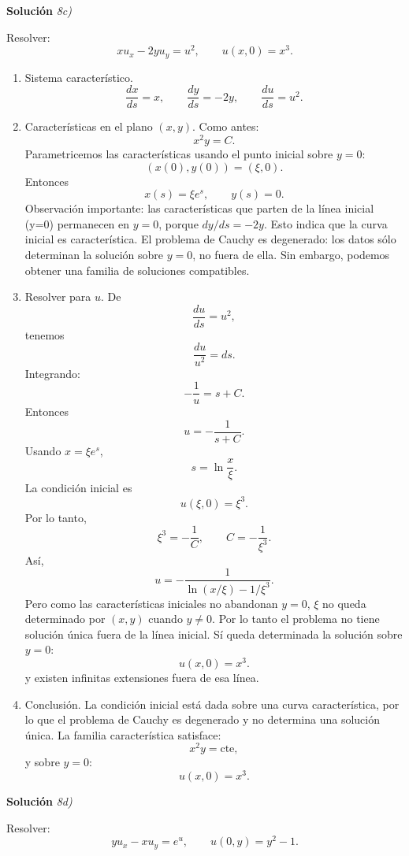 \documentclass[11pt,spanish]{article}
\newcounter{problema}
\begin{document}
\vspace{0.5cm}
{\bf Soluci\'on }{\em 8c)}
\vspace{0.5cm}

Resolver:
$$
x u_x-2y u_y=u^2,
\qquad
u(x,0)=x^3.
$$

\begin{enumerate}
\item Sistema característico.
$$
\frac{dx}{ds}=x,
\qquad
\frac{dy}{ds}=-2y,
\qquad
\frac{du}{ds}=u^2.
$$

\item Características en el plano $(x,y)$.
Como antes:
$$
x^2y=C.
$$
Parametricemos las características usando el punto inicial sobre $y=0$:
$$
(x(0),y(0))=(\xi,0).
$$
Entonces
$$
x(s)=\xi e^s,
\qquad
y(s)=0.
$$
Observación importante: las características que parten de la línea inicial (y=0) permanecen en $y=0$, porque $dy/ds=-2y$.
Esto indica que la curva inicial es característica. El problema de Cauchy es degenerado: los datos sólo determinan la solución sobre $y=0$, no fuera de ella.
Sin embargo, podemos obtener una familia de soluciones compatibles.

\item Resolver para $u$.
De
$$
\frac{du}{ds}=u^2,
$$
tenemos
$$
\frac{du}{u^2}=ds.
$$
Integrando:
$$
-\frac1u=s+C.
$$
Entonces
$$
u=-\frac1{s+C}.
$$
Usando $x=\xi e^s$,
$$
s=\ln\frac{x}{\xi}.
$$
La condición inicial es
$$
u(\xi,0)=\xi^3.
$$
Por lo tanto,
$$
\xi^3
=
-\frac1C,
\qquad
C=-\frac1{\xi^3}.
$$
Así,
$$
u=
-\frac1{\ln(x/\xi)-1/\xi^3}.
$$
Pero como las características iniciales no abandonan $y=0$, $\xi$ no queda determinado por $(x,y)$ cuando $y\neq0$. Por lo tanto el problema no tiene solución única fuera de la línea inicial.
Sí queda determinada la solución sobre $y=0$:
$$
u(x,0)=x^3.
$$
y existen infinitas extensiones fuera de esa línea.

\item Conclusión.
La condición inicial está dada sobre una curva característica, por lo que el problema de Cauchy es degenerado y no determina una solución única.
La familia característica satisface:
$$
x^2y=\text{cte},
$$
y sobre $y=0$:
$$
\boxed{
u(x,0)=x^3.
}
$$
\end{enumerate} 

\vspace{0.5cm}
{\bf Soluci\'on }{\em 8d)}
\vspace{0.5cm}

Resolver:
$$
y u_x-x u_y=e^u,
\qquad
u(0,y)=y^2-1.
$$
\end{document}
